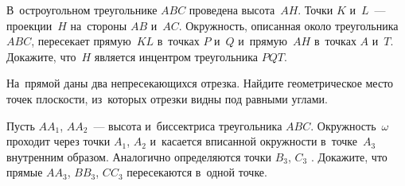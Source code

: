 \begin{problems}
\item
В~остроугольном треугольнике $ABC$ проведена высота~$AH$.
Точки $K$ и~$L$~--- проекции~$H$ на~стороны $AB$ и~$AC$.
Окружность, описанная около треугольника $ABC$, пересекает прямую~$KL$ в~точках
$P$ и~$Q$ и~прямую~$AH$ в~точках $A$ и~$T$.
Докажите, что~$H$ является инцентром треугольника $PQT$.

\item
На~прямой даны два непресекающихся отрезка.
Найдите геометрическое место точек плоскости, из~которых отрезки видны под
равными углами.

\item
Пусть $AA_{1}$, $AA_{2}$~--- высота и~биссектриса треугольника $ABC$.
Окружность~$\omega$ проходит через точки $A_1$, $A_2$ и~касается вписанной
окружности в~точке~$A_3$ внутренним образом.
Аналогично определяются точки $B_3$, $C_3$ .
Докажите, что прямые $AA_{3}$, $BB_{3}$, $CC_{3}$ пересекаются в~одной точке.

\end{problems}

